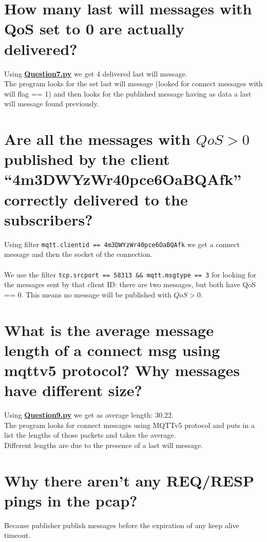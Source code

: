 \documentclass{article} %
\begin{document}
\section{\large{How many last will messages with QoS set to 0 are actually delivered?}} 
    Using \href{https://github.com/LucaFerraro/IoT-HomeChallenge/blob/master/3/Question7.py}{\textcolor{url_blue}{\textbf{Question7.py}}} we get 4 delivered last will message. \\
    The program looks for the set last will message (looked for connect messages with will flag == 1) and then looks for the published message having as data a last will message found previously.

   
\section{\large{Are all the messages with $QoS > 0$ published by the client “4m3DWYzWr40pce6OaBQAfk” correctly delivered to the subscribers?}}
    Using filter \texttt{mqtt.clientid == 4m3DWYzWr40pce6OaBQAfk} we get a connect message and then the socket of the connection. \\ \\
    We use the filter \texttt{tcp.srcport == 58313 \&\& mqtt.msgtype == 3} for looking for the messages sent by that client ID: 
    there are two messages, but both have QoS == 0. This means no message will be published with $QoS > 0$.



\section{\large{What is the average message length of a connect msg using mqttv5 protocol? Why messages have different size?}}
    Using \href{https://github.com/LucaFerraro/IoT-HomeChallenge/blob/master/3/Question9.py}{\textcolor{url_blue}{\textbf{Question9.py}}} we get as average length: 30.22. \\
    The program looks for connect messages using MQTTv5 protocol and puts in a list the lengths of those packets and takes the average. \\
    Different lengths are due to the presence of a last will message.


\section{\large{Why there aren’t any REQ/RESP pings in the pcap?}}
Because publisher publish messages before the expiration of any keep alive timeout.
\end{document}
